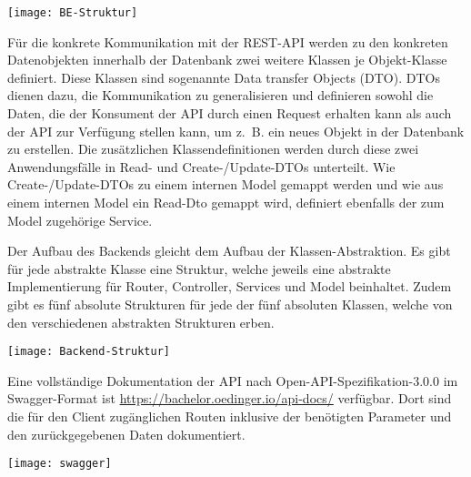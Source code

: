 \vspace{20pt}
\begin{center}
    \begin{minipage}{1\linewidth}
        \texttt{[image: BE-Struktur]}
    \end{minipage}
\end{center}
\vspace{20pt}

Für die konkrete Kommunikation mit der REST-API werden zu den konkreten Datenobjekten innerhalb der Datenbank zwei weitere Klassen je Objekt-Klasse definiert. Diese Klassen sind sogenannte Data transfer Objects (DTO). DTOs dienen dazu, die Kommunikation zu generalisieren und definieren sowohl die Daten, die der Konsument der API durch einen Request erhalten kann als auch der API zur Verfügung stellen kann, um z. B. ein neues Objekt in der Datenbank zu erstellen. Die zusätzlichen Klassendefinitionen werden durch diese zwei Anwendungsfälle in Read- und Create-/Update-DTOs unterteilt. Wie Create-/Update-DTOs zu einem internen Model gemappt werden und wie aus einem internen Model ein Read-Dto gemappt wird, definiert ebenfalls der zum Model zugehörige Service.

Der Aufbau des Backends gleicht dem Aufbau der Klassen-Abstraktion. Es gibt für jede abstrakte Klasse eine Struktur, welche jeweils eine abstrakte Implementierung für Router, Controller, Services und Model beinhaltet.
Zudem gibt es fünf absolute Strukturen für jede der fünf absoluten Klassen, welche von den verschiedenen abstrakten Strukturen erben.

\vspace{20pt}
\begin{center}
    \begin{minipage}{0.8\linewidth}
        \texttt{[image: Backend-Struktur]}
    \end{minipage}
\end{center}
\vspace{20pt}

Eine vollständige Dokumentation der API nach Open-API-Spezifikation-3.0.0 im Swagger-Format ist \href{https://bachelor.oedinger.io/api-docs/}{https://bachelor.oedinger.io/api-docs/} verfügbar. Dort sind die für den Client zugänglichen Routen inklusive der benötigten Parameter und den zurückgegebenen Daten dokumentiert.

\vspace{20pt}
\begin{center}
    \begin{minipage}{0.95\linewidth}
        \texttt{[image: swagger]}
    \end{minipage}
\end{center}
\vspace{20pt}

